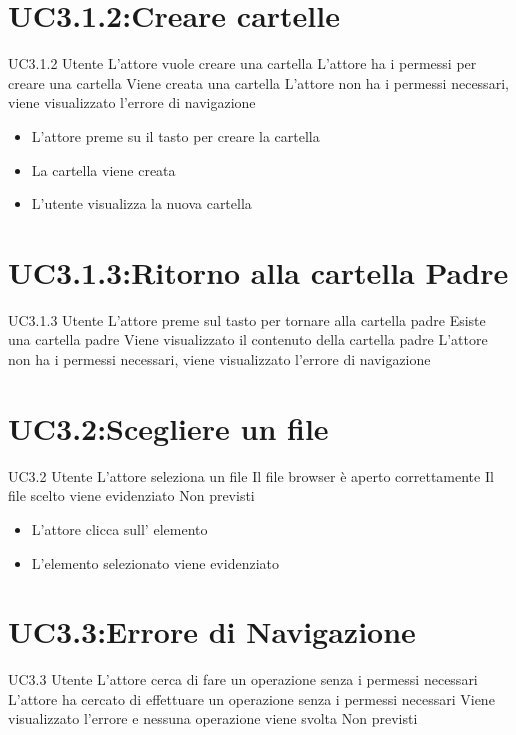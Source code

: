 \documentclass[../AnalisideiRequisiti.tex]{subfiles}
\begin{document}
	\section{UC3.1.2:Creare cartelle}
	\UserCase
	{UC3.1.2}
	{Utente}
	{}
	{L'attore vuole creare una cartella}
	{L'attore ha i permessi per creare una cartella}
	{Viene creata una cartella}
	{L'attore non ha i permessi necessari, viene visualizzato l'errore di navigazione }
	{
		\begin{itemize}
		\item{} L'attore preme su il tasto per creare la cartella
		\item{} La cartella viene creata
		\item{} L'utente visualizza la nuova cartella
		\end{itemize}
	}

	\section{UC3.1.3:Ritorno alla cartella Padre}
\UserCase
{UC3.1.3}
{Utente}
{}
{L'attore preme sul tasto per tornare alla cartella padre}
{Esiste una cartella padre}
{Viene visualizzato il contenuto della cartella padre}
{L'attore non ha i permessi necessari, viene visualizzato l'errore di navigazione }
{}
	\section{UC3.2:Scegliere un file}
\UserCase
{UC3.2}
{Utente}
{}
{L'attore seleziona un file}
{Il file browser è aperto correttamente}
{Il file scelto viene evidenziato}
{Non previsti}
{
	\begin{itemize}
		\item{} L'attore clicca sull' elemento
		\item{} L'elemento selezionato viene evidenziato
	\end{itemize}
}
\section{UC3.3:Errore di Navigazione}
\UserCase
{UC3.3}
{Utente}
{}
{L'attore cerca di fare un operazione senza i permessi necessari}
{L'attore ha cercato di effettuare un operazione senza i permessi necessari}
{Viene visualizzato l'errore e nessuna operazione viene svolta}
{Non previsti}
{}
\end{document}
